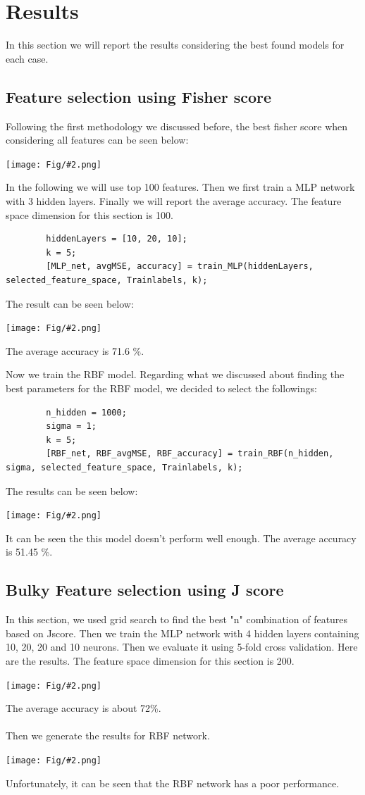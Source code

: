 \documentclass[]{article}
\newcommand{\pict}[2]{\begin{center}
		\texttt{[image: Fig/\#2.png]}
\end{center}}
\begin{document}
	\section{Results}
	In this section we will report the results considering the best found models for each case.
	\subsection{Feature selection using Fisher score}
	Following the first methodology we discussed before, the best fisher score when considering all features can be seen below:
	\pict{1}{F5}
	In the following we will use top 100 features. Then we first train a MLP network with 3 hidden layers. Finally we will report the average accuracy. The feature space dimension for this section is 100.
	\begin{lstlisting}
		hiddenLayers = [10, 20, 10];
		k = 5;
		[MLP_net, avgMSE, accuracy] = train_MLP(hiddenLayers, selected_feature_space, Trainlabels, k);
	\end{lstlisting}
	The result can be seen below:
	\pict{0.6}{F6}
	The average accuracy is 71.6 \%.
	
	Now we train the RBF model. Regarding what we discussed about finding the best parameters for the RBF model, we decided to select the followings:
	\begin{lstlisting}
		n_hidden = 1000;
		sigma = 1;
		k = 5;
		[RBF_net, RBF_avgMSE, RBF_accuracy] = train_RBF(n_hidden, sigma, selected_feature_space, Trainlabels, k);
	\end{lstlisting}
	The results can be seen below:
	\pict{0.6}{F7}
	It can be seen the this model doesn't perform well enough. The average accuracy is 51.45 \%.
	
	\subsection{Bulky Feature selection using J score}
	In this section, we used grid search to find the best "n" combination of features based on Jscore. Then we train the MLP network with 4 hidden layers containing 10, 20, 20 and 10 neurons. Then we evaluate it using 5-fold cross validation. Here are the results. The feature space dimension for this section is 200.
	\pict{0.6}{F8}
	The average accuracy is about 72\%.\\\\
	Then we generate the results for RBF network.
	\pict{0.6}{F9}
	Unfortunately, it can be seen that the RBF network has a poor performance.
	
\end{document}
